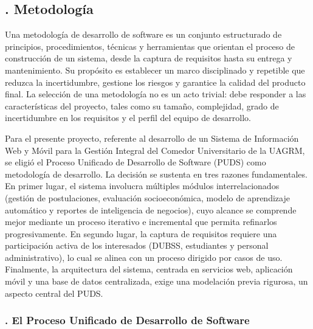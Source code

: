 \subsection{. Metodología}\label{sec:metodologia}

Una metodología de desarrollo de software es un conjunto estructurado de principios, procedimientos, técnicas y herramientas que orientan el proceso de construcción de un sistema, desde la captura de requisitos hasta su entrega y mantenimiento. Su propósito es establecer un marco disciplinado y repetible que reduzca la incertidumbre, gestione los riesgos y garantice la calidad del producto final. La selección de una metodología no es un acto trivial: debe responder a las características del proyecto, tales como su tamaño, complejidad, grado de incertidumbre en los requisitos y el perfil del equipo de desarrollo.

Para el presente proyecto, referente al desarrollo de un Sistema de Información Web y Móvil para la Gestión Integral del Comedor Universitario de la UAGRM, se eligió el Proceso Unificado de Desarrollo de Software (PUDS) como metodología de desarrollo. La decisión se sustenta en tres razones fundamentales. En primer lugar, el sistema involucra múltiples módulos interrelacionados (gestión de postulaciones, evaluación socioeconómica, modelo de aprendizaje automático y reportes de inteligencia de negocios), cuyo alcance se comprende mejor mediante un proceso iterativo e incremental que permita refinarlos progresivamente. En segundo lugar, la captura de requisitos requiere una participación activa de los interesados (DUBSS, estudiantes y personal administrativo), lo cual se alinea con un proceso dirigido por casos de uso. Finalmente, la arquitectura del sistema, centrada en servicios web, aplicación móvil y una base de datos centralizada, exige una modelación previa rigurosa, un aspecto central del PUDS.

\subsubsection{. El Proceso Unificado de Desarrollo de Software}\label{sec:puds}

